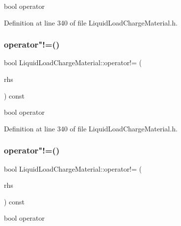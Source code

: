 bool operator 

Definition at line 340 of file Liquid\+Load\+Charge\+Material.\+h.

\mbox{\label{class_liquid_load_charge_material_aa6ad825ee8ab1c7816ce3bf10260c0bb}} 
\subsubsection{\texorpdfstring{operator"!=()}{operator!=()}\hspace{0.1cm}{\footnotesize\ttfamily [2/3]}}
{\footnotesize\ttfamily bool Liquid\+Load\+Charge\+Material\+::operator!= (\begin{DoxyParamCaption}\item[{const \hyperlink{class_liquid_load_charge_material}{Liquid\+Load\+Charge\+Material} \&}]{rhs }\end{DoxyParamCaption}) const\hspace{0.3cm}{\ttfamily [inline]}}

bool operator 

Definition at line 340 of file Liquid\+Load\+Charge\+Material.\+h.

\mbox{\label{class_liquid_load_charge_material_aa6ad825ee8ab1c7816ce3bf10260c0bb}} 
\subsubsection{\texorpdfstring{operator"!=()}{operator!=()}\hspace{0.1cm}{\footnotesize\ttfamily [3/3]}}
{\footnotesize\ttfamily bool Liquid\+Load\+Charge\+Material\+::operator!= (\begin{DoxyParamCaption}\item[{const \hyperlink{class_liquid_load_charge_material}{Liquid\+Load\+Charge\+Material} \&}]{rhs }\end{DoxyParamCaption}) const\hspace{0.3cm}{\ttfamily [inline]}}

bool operator 

